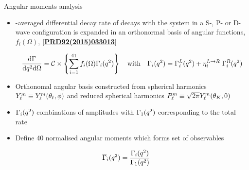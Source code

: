 \documentclass[aspectratio=1610]{beamer}
\begin{document}
\begin{frame}{Angular moments analysis}
\begin{itemize}
\item \CP-averaged differential decay rate of \BdToKpimm decays with the \kaon\pion system in a S-, P- or D-wave configuration is expanded in an orthonormal basis of angular functions, $f_i(\Omega)$, {\scriptsize \bf \href{http://journals.aps.org/prd/abstract/10.1103/PhysRevD.92.033013}{[PRD92(2015)033013]}}

\begin{equation*}
\frac{\mathrm{d}\Gamma }{\mathrm{d}{q^2} \mathrm{d}\Omega} = \mathcal{C} \times \left\{ \displaystyle \sum^{41}_{i=1} f_i (\Omega) \Gamma_i({q^2}) \right\} 
 \quad\mbox{with}\quad
\Gamma_i({q^2}) = \Gamma^L_i({q^2}) + \eta^{L\rightarrow R}_i\; \Gamma^R_i({q^2})
\end{equation*}

\item Orthonomal angular basis constructed from spherical harmonics $Y^m_\ell \equiv Y^m_\ell (\theta_\ell,\phi)$ and reduced spherical harmonics ${P^m_\ell \equiv \sqrt{2 \pi}Y^m_\ell(\theta_K,0)}$
\item $\Gamma_i({q^2})$ combinations of \KstarJ amplitudes with $\Gamma_{1}({q^2})$ corresponding to the total rate
\item Define 40 normalised angular moments which forms set of observables
\end{itemize}
\begin{equation*}
\overline{\Gamma}_i({q^2}) = \frac{\Gamma_{i}({q^2})}{\Gamma_{1}({q^2})}
\end{equation*}

\end{frame}
\end{document}
